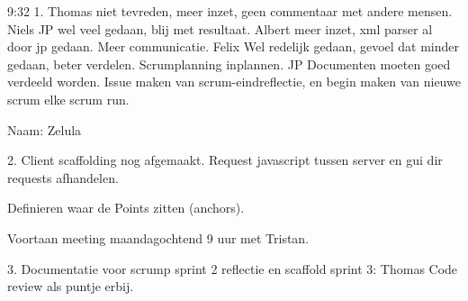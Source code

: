 9:32
1.
Thomas
niet tevreden, meer inzet, geen commentaar met andere mensen.
Niels
JP wel veel gedaan, blij met resultaat.
Albert
meer inzet, xml parser al door jp gedaan. Meer communicatie.
Felix
Wel redelijk gedaan, gevoel dat minder gedaan, beter verdelen. Scrumplanning inplannen.
JP
Documenten moeten goed verdeeld worden.
Issue maken van scrum-eindreflectie, en begin maken van nieuwe scrum elke scrum run.

Naam:
Zelula

2.
Client scaffolding nog afgemaakt.
Request javascript tussen server en gui dir requests afhandelen.

Definieren waar de Points zitten (anchors).

Voortaan meeting maandagochtend 9 uur met Tristan.

3.
Documentatie voor scrump sprint 2 reflectie en scaffold sprint 3: Thomas
Code review als puntje erbij.